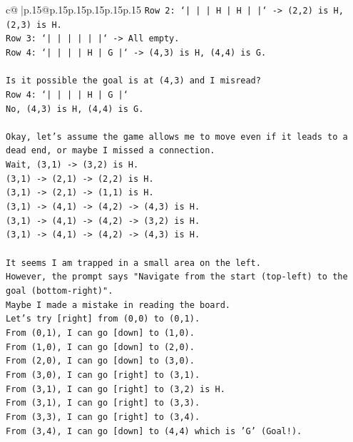 \documentclass{article}
\begin{document}
{\begin{supertabular}{c@{$\;$}|p{.15\linewidth}@{}p{.15\linewidth}p{.15\linewidth}p{.15\linewidth}p{.15\linewidth}p{.15\linewidth}}
{{{\texttt{Row 2: `|     |     |  H  |  H  |     |` {-}> (2,2) is H, (2,3) is H.} \\
\texttt{Row 3: `|     |     |     |     |     |` {-}> All empty.} \\
\texttt{Row 4: `|     |     |     |  H  |  G  |` {-}> (4,3) is H, (4,4) is G.} \\
\\ 
\texttt{Is it possible the goal is at (4,3) and I misread?} \\
\texttt{Row 4: `|     |     |     |  H  |  G  |`} \\
\texttt{No, (4,3) is H, (4,4) is G.} \\
\\ 
\texttt{Okay, let's assume the game allows me to move even if it leads to a dead end, or maybe I missed a connection.} \\
\texttt{Wait, (3,1) {-}> (3,2) is H.} \\
\texttt{(3,1) {-}> (2,1) {-}> (2,2) is H.} \\
\texttt{(3,1) {-}> (2,1) {-}> (1,1) is H.} \\
\texttt{(3,1) {-}> (4,1) {-}> (4,2) {-}> (4,3) is H.} \\
\texttt{(3,1) {-}> (4,1) {-}> (4,2) {-}> (3,2) is H.} \\
\texttt{(3,1) {-}> (4,1) {-}> (4,2) {-}> (4,3) is H.} \\
\\ 
\texttt{It seems I am trapped in a small area on the left.} \\
\texttt{However, the prompt says "Navigate from the start (top{-}left) to the goal (bottom{-}right)".} \\
\texttt{Maybe I made a mistake in reading the board.} \\
\texttt{Let's try {[}right{]} from (0,0) to (0,1).} \\
\texttt{From (0,1), I can go {[}down{]} to (1,0).} \\
\texttt{From (1,0), I can go {[}down{]} to (2,0).} \\
\texttt{From (2,0), I can go {[}down{]} to (3,0).} \\
\texttt{From (3,0), I can go {[}right{]} to (3,1).} \\
\texttt{From (3,1), I can go {[}right{]} to (3,2) is H.} \\
\texttt{From (3,1), I can go {[}right{]} to (3,3).} \\
\texttt{From (3,3), I can go {[}right{]} to (3,4).} \\
\texttt{From (3,4), I can go {[}down{]} to (4,4) which is 'G' (Goal!).} \\
}}}
\end{supertabular}}
\end{document}
